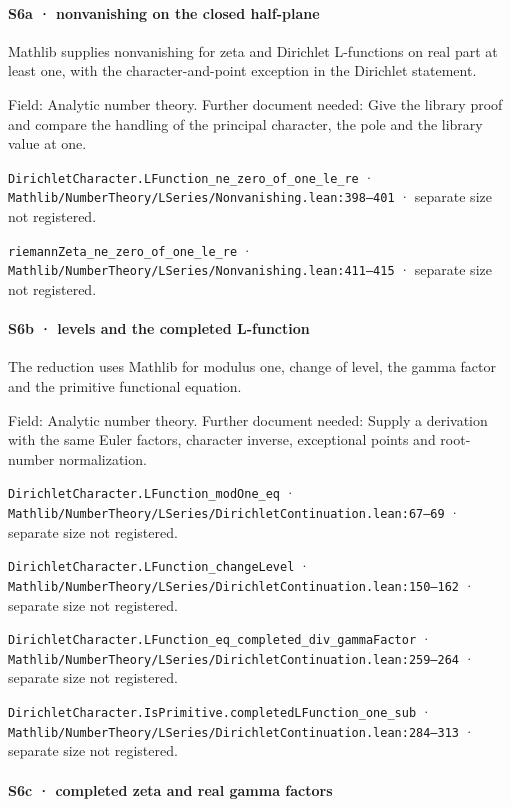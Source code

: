 \paragraph{S6a · nonvanishing on the closed half-plane}

Mathlib supplies nonvanishing for zeta and Dirichlet L-functions on real part at least one, with the character-and-point exception in the Dirichlet statement.

Field: Analytic number theory. Further document needed: Give the library proof and compare the handling of the principal character, the pole and the library value at one.

\nolinkurl{DirichletCharacter.LFunction_ne_zero_of_one_le_re} · \nolinkurl{Mathlib/NumberTheory/LSeries/Nonvanishing.lean:398–401} · separate size not registered.

\nolinkurl{riemannZeta_ne_zero_of_one_le_re} · \nolinkurl{Mathlib/NumberTheory/LSeries/Nonvanishing.lean:411–415} · separate size not registered.

\paragraph{S6b · levels and the completed L-function}

The reduction uses Mathlib for modulus one, change of level, the gamma factor and the primitive functional equation.

Field: Analytic number theory. Further document needed: Supply a derivation with the same Euler factors, character inverse, exceptional points and root-number normalization.

\nolinkurl{DirichletCharacter.LFunction_modOne_eq} · \nolinkurl{Mathlib/NumberTheory/LSeries/DirichletContinuation.lean:67–69} · separate size not registered.

\nolinkurl{DirichletCharacter.LFunction_changeLevel} · \nolinkurl{Mathlib/NumberTheory/LSeries/DirichletContinuation.lean:150–162} · separate size not registered.

\nolinkurl{DirichletCharacter.LFunction_eq_completed_div_gammaFactor} · \nolinkurl{Mathlib/NumberTheory/LSeries/DirichletContinuation.lean:259–264} · separate size not registered.

\nolinkurl{DirichletCharacter.IsPrimitive.completedLFunction_one_sub} · \nolinkurl{Mathlib/NumberTheory/LSeries/DirichletContinuation.lean:284–313} · separate size not registered.

\paragraph{S6c · completed zeta and real gamma factors}


